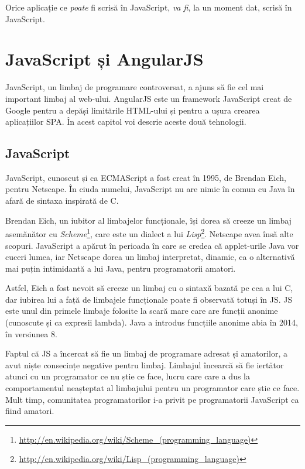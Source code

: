 \begin{savequote}[75mm]
Orice aplicație ce \emph{poate} fi scrisă în JavaScript, \emph{va fi},
la un moment dat, scrisă în JavaScript.
\end{savequote}

\chapter{JavaScript și AngularJS}

JavaScript, un limbaj de programare controversat, a ajuns să fie 
cel mai important limbaj al web-ului. AngularJS este un framework
JavaScript creat de Google pentru a depăși limitările HTML-ului și pentru a
ușura crearea aplicațiilor SPA. În acest capitol voi descrie aceste
două tehnologii.


\section{JavaScript}

JavaScript, cunoscut și ca ECMAScript a fost creat în 1995, 
de Brendan Eich, pentru Netscape. În ciuda
numelui, JavaScript nu are nimic în comun cu Java în afară de sintaxa
inspirată de C.

Brendan Eich, un iubitor al limbajelor funcționale, își dorea să creeze
un limbaj asemănător cu \emph{Scheme}\footnote{\url{http://en.wikipedia.org/wiki/Scheme\_(programming\_language)}}, care este un dialect a lui 
\emph{Lisp}\footnote{\url{http://en.wikipedia.org/wiki/Lisp\_(programming_language)}}. 
Netscape avea însă alte scopuri. JavaScript a apărut în perioada în care
se credea că applet-urile Java vor cuceri lumea, iar Netscape dorea un limbaj
interpretat, dinamic, ca o alternativă mai puțin intimidantă a lui Java,
pentru programatorii amatori.

Astfel, Eich a fost nevoit să creeze un limbaj cu o sintaxă bazată pe cea
a lui C, dar iubirea lui a față de limbajele funcționale poate fi observată
totuși în JS. JS este unul din primele limbaje folosite la scară mare
care are funcții anonime (cunoscute și ca expresii lambda). Java a introdus
funcțiile anonime abia în 2014, în versiunea 8.

Faptul că JS a încercat să fie un limbaj de programare adresat
și amatorilor, a avut niște consecințe negative pentru limbaj.
Limbajul încearcă să fie iertător atunci cu un programator ce
nu știe ce face, lucru care care a dus la comportamentul neașteptat
al limbajului pentru un programator care știe ce face.
Mult timp, comunitatea programatorilor
i-a privit pe programatorii JavaScript ca fiind amatori.

